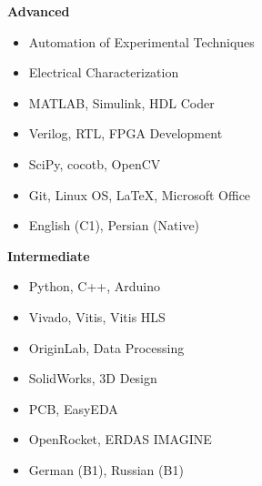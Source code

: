 {\centering
    \begin{minipage}[t]{\cvskillscolumnwidth}
        \textbf{Advanced}
        \begin{itemize}
            \item Automation of Experimental Techniques
            \item Electrical Characterization
            \item MATLAB, Simulink, HDL Coder
            \item Verilog, RTL, FPGA Development
            \item SciPy, cocotb, OpenCV
            \item Git, Linux OS, \LaTeX, Microsoft Office
            \item English (C1), Persian (Native)
        \end{itemize}
    \end{minipage}
    \hfill
    \begin{minipage}[t]{\cvskillscolumnwidth}
        \textbf{Intermediate}
        \begin{itemize}
            \item Python, C++, Arduino
            \item Vivado, Vitis, Vitis HLS
            \item OriginLab, Data Processing
            \item SolidWorks, 3D Design
            \item PCB, EasyEDA
            \item OpenRocket, ERDAS IMAGINE
            \item German (B1), Russian (B1)
        \end{itemize}
    \end{minipage}
\par}

